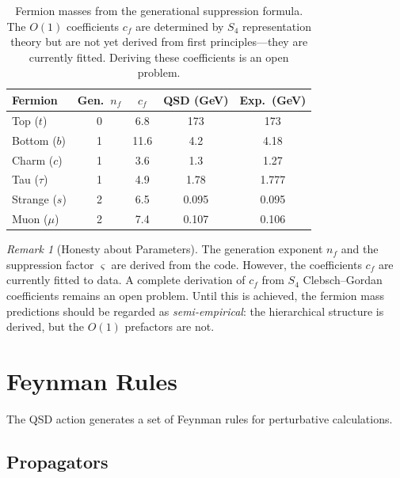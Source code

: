 \documentclass[11pt,a4paper]{article}
\theoremstyle{definition}
\theoremstyle{remark}
\newtheorem{remark}[theorem]{Remark}
\newcommand{\strain}{\varsigma}
\begin{document}
\begin{table}[H]
\centering
\begin{tabular}{lcccc}
\toprule
\textbf{Fermion} & \textbf{Gen.\ $n_f$} & \textbf{$c_f$} & \textbf{QSD (GeV)} & \textbf{Exp.\ (GeV)} \\
\midrule
Top ($t$) & 0 & 6.8 & 173 & 173 \\
Bottom ($b$) & 1 & 11.6 & 4.2 & 4.18 \\
Charm ($c$) & 1 & 3.6 & 1.3 & 1.27 \\
Tau ($\tau$) & 1 & 4.9 & 1.78 & 1.777 \\
Strange ($s$) & 2 & 6.5 & 0.095 & 0.095 \\
Muon ($\mu$) & 2 & 7.4 & 0.107 & 0.106 \\
\bottomrule
\end{tabular}
\caption{Fermion masses from the generational suppression formula. The $O(1)$ coefficients $c_f$ are determined by $S_4$ representation theory but are not yet derived from first principles---they are currently fitted. Deriving these coefficients is an open problem.}
\label{tab:fermion_masses}
\end{table}

\begin{remark}[Honesty about Parameters]
The generation exponent $n_f$ and the suppression factor $\strain$ are derived from the code. However, the coefficients $c_f$ are currently fitted to data. A complete derivation of $c_f$ from $S_4$ Clebsch--Gordan coefficients remains an open problem. Until this is achieved, the fermion mass predictions should be regarded as \emph{semi-empirical}: the hierarchical structure is derived, but the $O(1)$ prefactors are not.
\end{remark}

\section{Feynman Rules}
\label{sec:feynman}

The QSD action generates a set of Feynman rules for perturbative calculations.

\subsection{Propagators}
\end{document}
